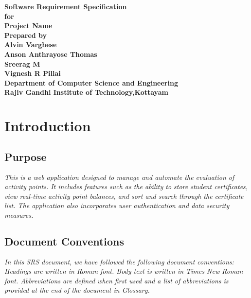 \documentclass{article}
\begin{document}
\begin{center}
\textbf{\Huge Software Requirement Specification}\\
\vspace{70pt}
\textbf{\Large for}\\
\vspace{60pt}
\textbf{\LARGE Project Name}\\
\vspace{40pt}
\textbf{\large Prepared by}\\
\vspace{30pt}
\textbf{\Large Alvin Varghese}\\
\vspace{18pt}
\textbf{\Large Anson Anthrayose Thomas}\\
\vspace{18pt}
\textbf{\Large Sreerag M}\\
\vspace{18pt}
\textbf{\Large Vignesh R Pillai}\\
\vspace{70pt}
\textbf{Department of Computer Science and Engineering}\\
\vspace{20pt}
\textbf{Rajiv Gandhi Institute of Technology,Kottayam}
\end{center}
\newpage
\tableofcontents
\newpage
\section{Introduction}
\subsection{Purpose}
\emph{This is a web application designed to manage and automate the evaluation of activity points. It includes features such as the ability to store student certificates, view real-time activity point balances, and sort and search through the certificate list. The application also incorporates user authentication and data security measures.
}
\subsection{Document Conventions}
\emph{In this SRS document, we have followed the following document conventions:
Headings are written in Roman font.
Body text is written in Times New Roman font.
Abbreviations are defined when first used and a list of abbreviations is provided at the end of the document in Glossary.
} 
\end{document}
